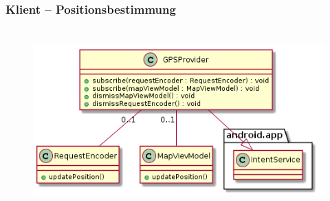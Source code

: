 \documentclass[aspectratio=1610]{beamer}
\begin{document}
     \begin{frame}[plain]
      \frametitle{\textbf{Klient} -- Positionsbestimmung}
      \begin{figure}[!htb]
        \centering
        \includegraphics[height = 200pt]{images/gpsprovider.png}
        \end{figure}
    \end{frame}
        

\end{document}
